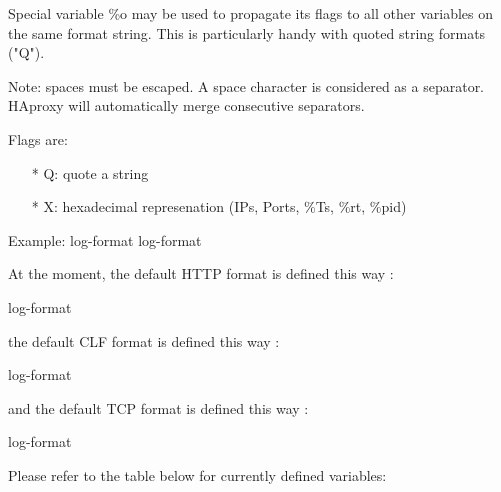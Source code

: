 Special variable \%o may be used to propagate its flags to all other
variables on the same format string. This is particularly handy with quoted
string formats ("Q").

Note: spaces must be escaped. A space character is considered as a separator.
HAproxy will automatically merge consecutive separators.

Flags are:
\begin{itemize}
\item[*] Q: quote a string
\item[*] X: hexadecimal represenation (IPs, Ports, \%Ts, \%rt, \%pid)
\end{itemize}

\begin{example}{Example:}
    log-format %
    log-format %

At the moment, the default HTTP format is defined this way :

    log-format %

the default CLF format is defined this way :

    log-format %

and the default TCP format is defined this way :

    log-format %
\end{example}

Please refer to the table below for currently defined variables:



